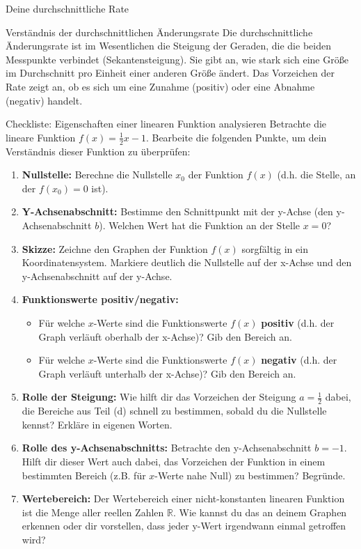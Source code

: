 \begin{loesungsumgebung}{Deine durchschnittliche Rate}
\begin{tippumgebung}{Verständnis der durchschnittlichen Änderungsrate}
Die durchschnittliche Änderungsrate ist im Wesentlichen die Steigung der Geraden, die die beiden Messpunkte verbindet (Sekantensteigung). Sie gibt an, wie stark sich eine Größe im Durchschnitt pro Einheit einer anderen Größe ändert. Das Vorzeichen der Rate zeigt an, ob es sich um eine Zunahme (positiv) oder eine Abnahme (negativ) handelt.
\end{tippumgebung}

\end{loesungsumgebung}

\begin{aufgabenumgebung}{Checkliste: Eigenschaften einer linearen Funktion analysieren}
Betrachte die lineare Funktion $f(x) = \frac{1}{2}x - 1$.
Bearbeite die folgenden Punkte, um dein Verständnis dieser Funktion zu überprüfen:

\begin{enumerate}[label=(\alph*)]
    \item \textbf{Nullstelle:} Berechne die Nullstelle $x_0$ der Funktion $f(x)$ (d.h. die Stelle, an der $f(x_0)=0$ ist).
    \item \textbf{Y-Achsenabschnitt:} Bestimme den Schnittpunkt mit der y-Achse (den y-Achsenabschnitt $b$). Welchen Wert hat die Funktion an der Stelle $x=0$?
    \item \textbf{Skizze:} Zeichne den Graphen der Funktion $f(x)$ sorgfältig in ein Koordinatensystem. Markiere deutlich die Nullstelle auf der x-Achse und den y-Achsenabschnitt auf der y-Achse.
    \item \textbf{Funktionswerte positiv/negativ:}
    \begin{itemize}
        \item Für welche $x$-Werte sind die Funktionswerte $f(x)$ \textbf{positiv} (d.h. der Graph verläuft oberhalb der x-Achse)? Gib den Bereich an.
        \item Für welche $x$-Werte sind die Funktionswerte $f(x)$ \textbf{negativ} (d.h. der Graph verläuft unterhalb der x-Achse)? Gib den Bereich an.
    \end{itemize}
    \item \textbf{Rolle der Steigung:} Wie hilft dir das Vorzeichen der Steigung $a = \frac{1}{2}$ dabei, die Bereiche aus Teil (d) schnell zu bestimmen, sobald du die Nullstelle kennst? Erkläre in eigenen Worten.
    \item \textbf{Rolle des y-Achsenabschnitts:} Betrachte den y-Achsenabschnitt $b=-1$. Hilft dir dieser Wert auch dabei, das Vorzeichen der Funktion in einem bestimmten Bereich (z.B. für $x$-Werte nahe Null) zu bestimmen? Begründe.
    \item \textbf{Wertebereich:} Der Wertebereich einer nicht-konstanten linearen Funktion ist die Menge aller reellen Zahlen $\mathbb{R}$. Wie kannst du das an deinem Graphen erkennen oder dir vorstellen, dass jeder y-Wert irgendwann einmal getroffen wird?
\end{enumerate}
\end{aufgabenumgebung}

